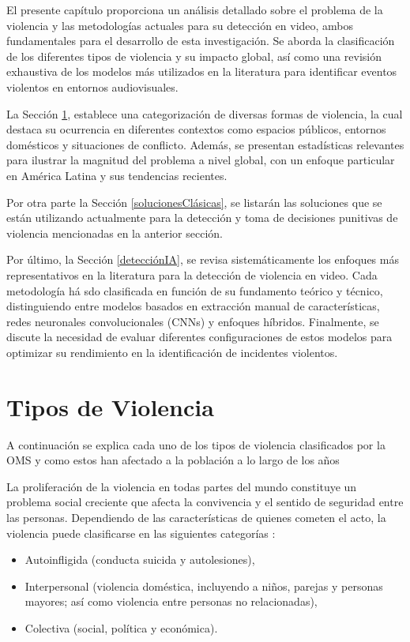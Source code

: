 El presente capítulo proporciona un análisis detallado sobre el
problema de la violencia y las metodologías actuales para su
detección en video, ambos fundamentales para el desarrollo de
esta investigación. Se aborda la clasificación de
los diferentes tipos de violencia y su impacto global, así como
una revisión exhaustiva de los modelos más utilizados en la
literatura para identificar eventos violentos en entornos
audiovisuales.

La Sección \ref{tiposDeViolencia}, establece una categorización de
diversas formas de violencia, la cual destaca su ocurrencia en
diferentes contextos como espacios públicos, entornos
domésticos y situaciones de conflicto. Además, se presentan
estadísticas relevantes para ilustrar la magnitud del problema
a nivel global, con un enfoque particular en América Latina y
sus tendencias recientes.

Por otra parte la Sección \ref{solucionesClásicas}, se listarán las soluciones 
que se están utilizando actualmente para la detección y toma de 
decisiones punitivas de violencia mencionadas en la anterior 
sección.

Por último, la Sección \ref{detecciónIA}, se revisa sistemáticamente 
los enfoques más representativos en la literatura para la
detección de violencia en video. Cada metodología há sdo 
clasificada en función de su fundamento teórico y técnico,
distinguiendo entre modelos basados en extracción manual de
características, redes neuronales convolucionales (CNNs) y
enfoques híbridos. Finalmente, se discute la necesidad de
evaluar diferentes configuraciones de estos modelos para
optimizar su rendimiento en la identificación de incidentes
violentos.


\section{Tipos de Violencia}\label{tiposDeViolencia}
A continuación se explica cada uno de los tipos de violencia 
clasificados por la OMS y como estos han afectado a la población 
a lo largo de los años 

La proliferación de la violencia en todas partes del mundo
constituye un problema social creciente que afecta la convivencia
y el sentido de seguridad entre las personas. Dependiendo de las
características de quienes cometen el acto, la violencia puede
clasificarse en las siguientes categorías \cite{OMS2014}: 
\begin{itemize} 
    \item Autoinfligida (conducta suicida y autolesiones), 
    \item Interpersonal (violencia doméstica, incluyendo a niños, parejas y personas mayores; así como violencia entre personas no relacionadas), 
    \item Colectiva (social, política y económica). 
\end{itemize}


